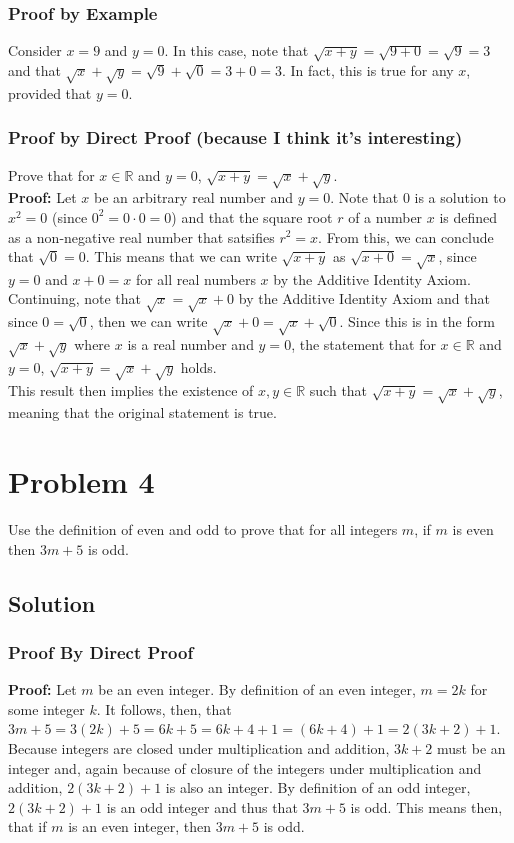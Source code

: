 \documentclass[table]{article}
\begin{document}
\subsubsection{Proof by Example}
Consider $x=9$ and $y=0$. In this case, note that $\sqrt{x+y} = \sqrt{9+0} = \sqrt{9} = 3$ and that $\sqrt{x} + \sqrt{y}= \sqrt{9} + \sqrt{0} = 3 + 0 = 3$. In fact, this is true for any $x$, provided that $y=0$.
\subsubsection{Proof by Direct Proof (because I think it's interesting)}
Prove that for $x \in \mathbb{R}$ and $y=0$, $\sqrt{x + y} = \sqrt{x} + \sqrt{y}$.\\
\textbf{Proof:} Let $x$ be an arbitrary real number and $y=0$. Note that  $0$ is a solution to $x^2=0$ (since $0^2=0\cdot0=0$) and that the square root $r$ of a number $x$ is defined as a non-negative real number that satsifies $r^2=x$. From this, we can conclude that $\sqrt{0}=0$. This means that we can write $\sqrt{x+y}$ as $\sqrt{x+0}=\sqrt{x}$, since $y=0$ and $x+0=x$ for all real numbers $x$ by the Additive Identity Axiom. Continuing, note that $\sqrt{x} = \sqrt{x} + 0$ by the Additive Identity Axiom and that since $0=\sqrt{0}$, then we can write $\sqrt{x}+0=\sqrt{x}+\sqrt{0}$. Since this is in the form $\sqrt{x} + \sqrt{y}$ where $x$ is a real number and $y=0$, the statement that for $x \in \mathbb{R}$ and $y=0$, $\sqrt{x + y} = \sqrt{x} + \sqrt{y}$ holds.\\
This result then implies the existence of $x,y \in \mathbb{R}$ such that $\sqrt{x + y} = \sqrt{x} + \sqrt{y}$, meaning that the original statement is true.
\section{Problem 4}
Use the definition of even and odd to prove that for all integers $m$, if $m$ is even then $3m + 5$
is odd.
\subsection{Solution}
\subsubsection{Proof By Direct Proof}
\textbf{Proof:} Let $m$ be an even integer. By definition of an even integer, $m=2k$ for some integer $k$. It follows, then, that $3m + 5 = 3(2k) + 5 = 6k + 5 = 6k + 4 + 1 = (6k + 4) + 1 = 2(3k + 2) + 1$. Because integers are closed under multiplication and addition, $3k + 2$ must be an integer and, again because of closure of the integers under multiplication and addition, $2(3k+2)+1$ is also an integer. By definition of an odd integer, $2(3k+2) + 1$ is an odd integer and thus that $3m + 5$ is odd. This means then, that if $m$ is an even integer, then $3m + 5$ is odd.
\end{document}
